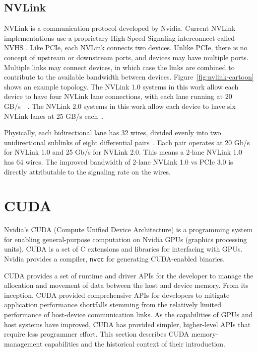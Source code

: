 \subsection{NVLink}

NVLink is a communication protocol developed by Nvidia.
Current NVLink implementations use a proprietary High-Speed Signaling interconnect called NVHS \cite{harris2016insidepascal}.
Like PCIe, each NVLink connects two devices.
Unlike PCIe, there is no concept of upstream or downstream ports, and devices may have multiple ports.
Multiple links may connect devices, in which case the links are combined to contribute to the available bandwidth between devices.
Figure~\ref{fig:nvlink-cartoon} shows an example topology.
The NVLink 1.0 systems in this work allow each device to have four NVLink lane connections, with each lane running at 20 GB/s~\cite{nvidia2017dgx1}~\cite{nvidia2016p100}.
The NVLink 2.0 systems in this work allow each device to have six NVLink lanes at 25 GB/s each~\cite{nvidia2017v100}.

Physically, each bidirectional lane has 32 wires, divided evenly into two unidirectional sublinks of eight differential pairs~\cite{harris2016insidepascal}.
Each pair operates at 20 Gb/s for NVLink 1.0 and 25 Gb/s for NVLink 2.0.
This means a 2-lane NVLink 1.0 has 64 wires.
The improved bandwidth of 2-lane NVLink 1.0 vs PCIe 3.0 is directly attributable to the signaling rate on the wires.

\section{CUDA}
\label{sec:cuda}

Nvidia's CUDA (Compute Unified Device Architecture) is a programming system for enabling general-purpose computation on Nvidia GPUs (graphics processing units).
CUDA is a set of C extensions and libraries for interfacing with GPUs.
Nvidia provides a compiler, \texttt{nvcc} for generating CUDA-enabled binaries.

CUDA provides a set of runtime and driver APIs for the developer to manage the allocation and movement of data between the host and device memory.
From its inception, CUDA provided comprehensive APIs for developers to mitigate application performance shortfalls stemming from the relatively limited performance of host-device communication links.
As the capabilities of GPUs and host systems have improved, CUDA has provided simpler, higher-level APIs that require less programmer effort.
This section describes CUDA memory-management capabilities and the historical context of their introduction.

